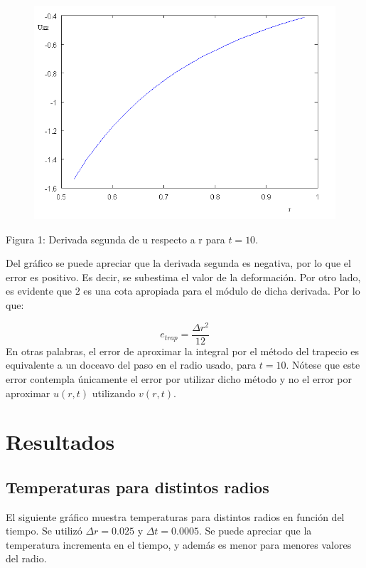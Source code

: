 ﻿\documentclass[%
final,
%
reprint,
%
notitlepage,
narroweqnarray,
inline,
twoside,
invited
]{ieee}
\begin{document}
\begin{figure}[H]
	\begin{center}
	\includegraphics[scale=0.2]{./img/uxx.png}
	\end{center}
\end{figure}
\begin{center}
\par Figura 1: Derivada segunda de u respecto a r para $t=10$.
\end{center}

Del gráfico se puede apreciar que la derivada segunda es negativa, por lo que el error es positivo. Es decir, 
se subestima el valor de la deformación. Por otro lado, es evidente que $2$ es una cota apropiada para el 
módulo de dicha derivada. Por lo que:

\[
e_{trap} = \frac{\Delta r^2}{12}
\]
En otras palabras, el error de aproximar la integral por el método del trapecio es equivalente a un doceavo 
del paso en el radio usado, para $t=10$. Nótese que este error contempla únicamente el error por utilizar 
dicho método y no el error por aproximar $u(r,t)$ utilizando $v(r,t)$.

\section{Resultados}

\subsection{Temperaturas para distintos radios}

El siguiente gráfico muestra temperaturas para distintos radios en función del tiempo. Se utilizó $\Delta r = 0.025$ 
y $\Delta t = 0.0005$. Se puede apreciar que la temperatura incrementa en el tiempo, y además es menor 
para menores valores del radio.
\end{document}
